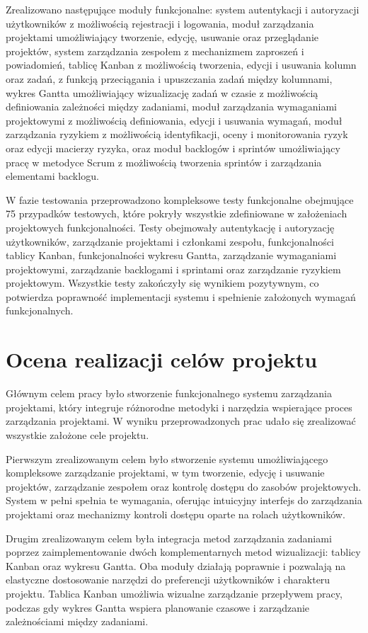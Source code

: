 Zrealizowano następujące moduły funkcjonalne: system autentykacji i autoryzacji użytkowników z możliwością rejestracji i logowania, moduł zarządzania projektami umożliwiający tworzenie, edycję, usuwanie oraz przeglądanie projektów, system zarządzania zespołem z mechanizmem zaproszeń i powiadomień, tablicę Kanban z możliwością tworzenia, edycji i usuwania kolumn oraz zadań, z funkcją przeciągania i upuszczania zadań między kolumnami, wykres Gantta umożliwiający wizualizację zadań w czasie z możliwością definiowania zależności między zadaniami, moduł zarządzania wymaganiami projektowymi z możliwością definiowania, edycji i usuwania wymagań, moduł zarządzania ryzykiem z możliwością identyfikacji, oceny i monitorowania ryzyk oraz edycji macierzy ryzyka, oraz moduł backlogów i sprintów umożliwiający pracę w metodyce Scrum z możliwością tworzenia sprintów i zarządzania elementami backlogu.

W fazie testowania przeprowadzono kompleksowe testy funkcjonalne obejmujące 75 przypadków testowych, które pokryły wszystkie zdefiniowane w założeniach projektowych funkcjonalności. Testy obejmowały autentykację i autoryzację użytkowników, zarządzanie projektami i członkami zespołu, funkcjonalności tablicy Kanban, funkcjonalności wykresu Gantta, zarządzanie wymaganiami projektowymi, zarządzanie backlogami i sprintami oraz zarządzanie ryzykiem projektowym. Wszystkie testy zakończyły się wynikiem pozytywnym, co potwierdza poprawność implementacji systemu i spełnienie założonych wymagań funkcjonalnych.

\section{Ocena realizacji celów projektu}

Głównym celem pracy było stworzenie funkcjonalnego systemu zarządzania projektami, który integruje różnorodne metodyki i narzędzia wspierające proces zarządzania projektami. W wyniku przeprowadzonych prac udało się zrealizować wszystkie założone cele projektu.

Pierwszym zrealizowanym celem było stworzenie systemu umożliwiającego kompleksowe zarządzanie projektami, w tym tworzenie, edycję i usuwanie projektów, zarządzanie zespołem oraz kontrolę dostępu do zasobów projektowych. System w pełni spełnia te wymagania, oferując intuicyjny interfejs do zarządzania projektami oraz mechanizmy kontroli dostępu oparte na rolach użytkowników.

Drugim zrealizowanym celem była integracja metod zarządzania zadaniami poprzez zaimplementowanie dwóch komplementarnych metod wizualizacji: tablicy Kanban oraz wykresu Gantta. Oba moduły działają poprawnie i pozwalają na elastyczne dostosowanie narzędzi do preferencji użytkowników i charakteru projektu. Tablica Kanban umożliwia wizualne zarządzanie przepływem pracy, podczas gdy wykres Gantta wspiera planowanie czasowe i zarządzanie zależnościami między zadaniami.

